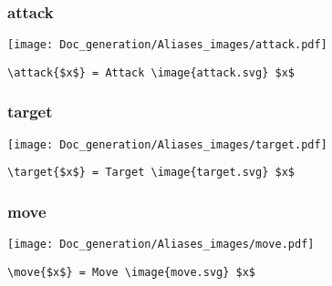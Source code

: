 \documentclass{article}
\begin{document}
\subsubsection{attack}
\begin{minipage}{0.45\linewidth}
\raggedright
\begin{spverbatim}
\end{spverbatim}
\end{minipage}
\begin{minipage}{0.45\linewidth}
\raggedleft
\texttt{[image: Doc\_generation/Aliases\_images/attack.pdf]}
\end{minipage}
\begin{center}
\begin{BVerbatim}
\attack{$x$} = Attack \image{attack.svg} $x$
\end{BVerbatim}
\end{center}

\subsubsection{target}
\begin{minipage}{0.45\linewidth}
\raggedright
\begin{spverbatim}
\end{spverbatim}
\end{minipage}
\begin{minipage}{0.45\linewidth}
\raggedleft
\texttt{[image: Doc\_generation/Aliases\_images/target.pdf]}
\end{minipage}
\begin{center}
\begin{BVerbatim}
\target{$x$} = Target \image{target.svg} $x$
\end{BVerbatim}
\end{center}

\subsubsection{move}
\begin{minipage}{0.45\linewidth}
\raggedright
\begin{spverbatim}
\end{spverbatim}
\end{minipage}
\begin{minipage}{0.45\linewidth}
\raggedleft
\texttt{[image: Doc\_generation/Aliases\_images/move.pdf]}
\end{minipage}
\begin{center}
\begin{BVerbatim}
\move{$x$} = Move \image{move.svg} $x$
\end{BVerbatim}
\end{center}
\end{document}
